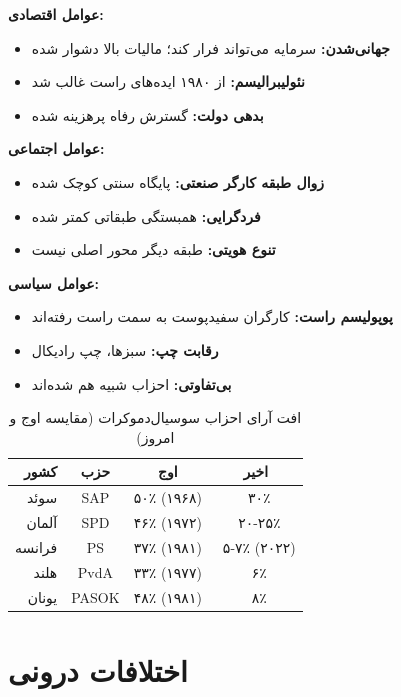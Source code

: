 \begin{debatebox}
\textbf{عوامل اقتصادی:}
\begin{itemize}[nosep]
    \item \textbf{جهانی‌شدن:} سرمایه می‌تواند فرار کند؛ مالیات بالا دشوار شده
    \item \textbf{نئولیبرالیسم:} از ۱۹۸۰ ایده‌های راست غالب شد
    \item \textbf{بدهی دولت:} گسترش رفاه پرهزینه شده
\end{itemize}

\textbf{عوامل اجتماعی:}
\begin{itemize}[nosep]
    \item \textbf{زوال طبقه کارگر صنعتی:} پایگاه سنتی کوچک شده
    \item \textbf{فردگرایی:} همبستگی طبقاتی کمتر شده
    \item \textbf{تنوع هویتی:} طبقه دیگر محور اصلی نیست
\end{itemize}

\textbf{عوامل سیاسی:}
\begin{itemize}[nosep]
    \item \textbf{پوپولیسم راست:} کارگران سفیدپوست به سمت راست رفته‌اند
    \item \textbf{رقابت چپ:} سبزها، چپ رادیکال
    \item \textbf{بی‌تفاوتی:} احزاب شبیه هم شده‌اند
\end{itemize}
\end{debatebox}

\begin{table}[htbp]
\centering
\caption{افت آرای احزاب سوسیال‌دموکرات (مقایسه اوج و امروز)}
\label{tab:socdem-decline}
\begin{tabular}{r|c|c|c}
\toprule
\textbf{کشور} & \textbf{حزب} & \textbf{اوج} & \textbf{اخیر} \\
\midrule
سوئد & SAP & ۵۰٪ (۱۹۶۸) & ~۳۰٪ \\
آلمان & SPD & ۴۶٪ (۱۹۷۲) & ~۲۰-۲۵٪ \\
فرانسه & PS & ۳۷٪ (۱۹۸۱) & ~۵-۷٪ (۲۰۲۲) \\
هلند & PvdA & ۳۳٪ (۱۹۷۷) & ~۶٪ \\
یونان & PASOK & ۴۸٪ (۱۹۸۱) & ~۸٪ \\
\bottomrule
\end{tabular}
\end{table}

\section{اختلافات درونی}

